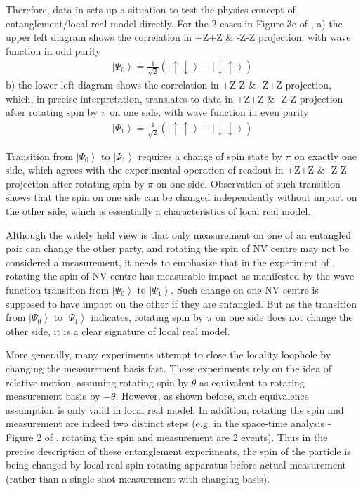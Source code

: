 \documentclass[prd,showpacs,twocolumn]{revtex4-1}
\begin{document}
Therefore, data in \cite{Hensen} sets up a situation to test the physics concept of entanglement/local real model directly. For the 2 cases in  Figure 3c of \cite{Hensen}, a) the upper left diagram shows the correlation in +Z+Z \& -Z-Z projection, with wave function in odd parity
\begin{eqnarray}
\left| \Psi_0\right >=\frac{1}{\sqrt{2}}(\left|\uparrow\downarrow\right>-\left|\downarrow\uparrow\right>)
\label{eqn:Psi_odd}
\end{eqnarray}
b) the lower left diagram shows the correlation in +Z-Z \& -Z+Z projection, which, in precise interpretation, translates to data in +Z+Z \& -Z-Z  projection after rotating spin by $\pi$ on one side, with wave function in even parity
\begin{eqnarray}
\left| \Psi_1\right >=\frac{1}{\sqrt{2}}(\left|\uparrow\uparrow\right>-\left|\downarrow\downarrow\right>)
\label{eqn:Psi_1}
\end{eqnarray}

Transition from $\left|\Psi_0\right>$ to $\left|\Psi_1\right>$ requires a change of spin state by $\pi$ on exactly one side, which agrees with the experimental operation of readout in +Z+Z \& -Z-Z projection after rotating spin by $\pi$ on one side. Observation of such transition shows that the spin on one side can be changed independently without impact on the other side, which is essentially a characteristics of local real model.

Although the widely held view is that only measurement on one of an entangled pair can change the other party, and rotating the spin of NV centre may not be considered a measurement, it needs to emphasize that in the experiment of \cite{Hensen}, rotating the spin of NV centre has measurable impact as manifested by the wave function transition from $\left|\Psi_0\right>$ to $\left|\Psi_1\right>$. Such change on one NV centre is supposed to have impact on the other if they are entangled. But as the transition from $\left|\Psi_0\right>$ to $\left|\Psi_1\right>$ indicates, rotating spin by $\pi$ on one side does not change the other side, it is a clear signature of local real model.

More generally, many experiments attempt to close the locality loophole by changing the measurement basis fast. These experiments \cite{Hensen,Giustina,Shalm} rely on the idea of relative motion, assuming rotating spin by $\theta$ as equivalent to rotating measurement basis by $-\theta$. However, as shown before, such equivalence assumption is only valid in local real model. In addition, rotating the spin and measurement are indeed two distinct steps (e.g. in the space-time analysis - Figure 2 of \cite{Hensen}, rotating the spin and measurement are 2 events). Thus in the precise description of these entanglement experiments, the spin of the particle is being changed by local real spin-rotating apparatus before actual measurement (rather than a single shot measurement with changing basis).
\end{document}
